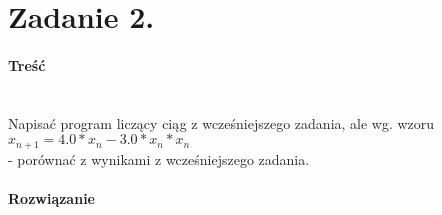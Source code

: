 \section*{Zadanie 2.} \label{sec:Zadanie2}

\paragraph{Treść} ~\\
Napisać program liczący ciąg z wcześniejszego zadania, ale wg. wzoru \\
$ x_{n+1} = 4.0 * x_{n} - 3.0 * x_{n} * x_{n} $ \\
- porównać z wynikami z wcześniejszego zadania. \\

\paragraph{Rozwiązanie} ~\\
 ~\\

